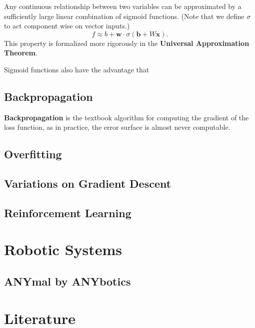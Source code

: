 \documentclass[12pt]{report}
\theoremstyle{definition}
\theoremstyle{remark}
\begin{document}
Any continuous relationship between two variables can be approximated by a sufficiently large linear combination of sigmoid functions. (Note that we define $\sigma$ to act component wise on vector inputs.)
\begin{equation}
    f \approx b + \mathbf{w} \cdot \sigma(\mathbf{b} + W\mathbf{x}).
\end{equation}
This property is formalized more rigorously in the \textbf{Universal Approximation Theorem}.\cite{hornik1989multilayer}

Sigmoid functions also have the advantage that


\section{Backpropagation}

\textbf{Backpropagation} is the textbook algorithm for computing the gradient of the loss function, as in practice, the error surface is almost never computable.



\section{Overfitting}

\section{Variations on Gradient Descent}

\section{Reinforcement Learning}

\chapter{Robotic Systems}

\section{ANYmal by ANYbotics}

\chapter{Literature}

\printglossaries

\printbibliography
{}
\end{document}
